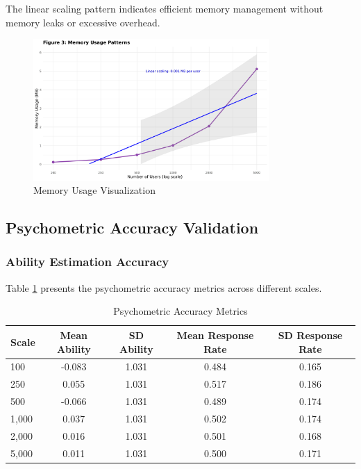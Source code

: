 \documentclass[11pt]{article}
\begin{document}
The linear scaling pattern indicates efficient memory management without memory leaks or excessive overhead.

\begin{figure}[H]
\centering
\includegraphics[width=0.8\textwidth]{Figure3_Memory_Usage.png}
\caption{Memory Usage Visualization}
\label{fig:memory}
\end{figure}

\subsection{Psychometric Accuracy Validation}

\subsubsection{Ability Estimation Accuracy}

Table \ref{tab:psychometric} presents the psychometric accuracy metrics across different scales.

\begin{table}[H]
\centering
\caption{Psychometric Accuracy Metrics}
\label{tab:psychometric}
\begin{tabular}{@{}lcccc@{}}
\toprule
Scale & Mean Ability & SD Ability & Mean Response Rate & SD Response Rate \\
\midrule
100   & -0.083       & 1.031      & 0.484             & 0.165            \\
250   & 0.055        & 1.031      & 0.517             & 0.186            \\
500   & -0.066       & 1.031      & 0.489             & 0.174            \\
1,000 & 0.037        & 1.031      & 0.502             & 0.174            \\
2,000 & 0.016        & 1.031      & 0.501             & 0.168            \\
5,000 & 0.011        & 1.031      & 0.500             & 0.171            \\
\bottomrule
\end{tabular}
\end{table}
\end{document}
